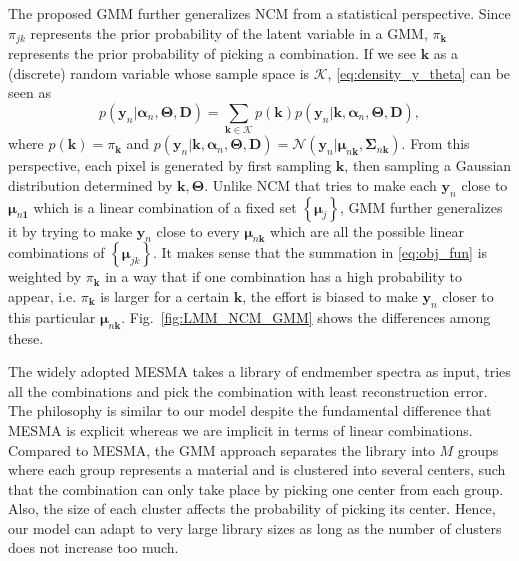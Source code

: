 \documentclass[twocolumn,english]{IEEEtran}
\theoremstyle{plain}
\begin{document}
The proposed GMM further generalizes NCM from a statistical perspective.
Since $\pi_{jk}$ represents the prior probability of the latent variable
in a GMM, $\pi_{\mathbf{k}}$ represents the prior probability of
picking a combination. If we see $\mathbf{k}$ as a (discrete) random
variable whose sample space is $\mathcal{K}$, \eqref{eq:density_y_theta}
can be seen as 
\[
p\left(\mathbf{y}_{n}\vert\boldsymbol{\alpha}_{n},\boldsymbol{\Theta},\mathbf{D}\right)=\sum_{\mathbf{k}\in\mathcal{K}}p\left(\mathbf{k}\right)p\left(\mathbf{y}_{n}\vert\mathbf{k},\boldsymbol{\alpha}_{n},\boldsymbol{\Theta},\mathbf{D}\right),
\]
where $p\left(\mathbf{k}\right)=\pi_{\mathbf{k}}$ and $p\left(\mathbf{y}_{n}\vert\mathbf{k},\boldsymbol{\alpha}_{n},\boldsymbol{\Theta},\mathbf{D}\right)=\mathcal{N}\left(\mathbf{y}_{n}\vert\boldsymbol{\mu}_{n\mathbf{k}},\boldsymbol{\Sigma}_{n\mathbf{k}}\right)$.
From this perspective, each pixel is generated by first sampling $\mathbf{k}$,
then sampling a Gaussian distribution determined by $\mathbf{k},\boldsymbol{\Theta}$.
Unlike NCM that tries to make each $\mathbf{y}_{n}$ close to $\boldsymbol{\mu}_{n\mathbf{1}}$
which is a linear combination of a fixed set $\left\{ \boldsymbol{\mu}_{j}\right\} $,
GMM further generalizes it by trying to make $\mathbf{y}_{n}$ close
to every $\boldsymbol{\mu}_{n\mathbf{k}}$ which are all the possible
linear combinations of $\left\{ \boldsymbol{\mu}_{jk}\right\} $.
It makes sense that the summation in \eqref{eq:obj_fun} is weighted
by $\pi_{\mathbf{k}}$ in a way that if one combination has a high
probability to appear, i.e. $\pi_{\mathbf{k}}$ is larger for a certain
$\mathbf{k}$, the effort is biased to make $\mathbf{y}_{n}$ closer
to this particular $\boldsymbol{\mu}_{n\mathbf{k}}$. Fig.~\ref{fig:LMM_NCM_GMM}
shows the differences among these.

The widely adopted MESMA takes a library of endmember spectra as input,
tries all the combinations and pick the combination with least reconstruction
error. The philosophy is similar to our model despite the fundamental
difference that MESMA is explicit whereas we are implicit in terms
of linear combinations. Compared to MESMA, the GMM approach separates
the library into $M$ groups where each group represents a material
and is clustered into several centers, such that the combination can
only take place by picking one center from each group. Also, the size
of each cluster affects the probability of picking its center. Hence,
our model can adapt to very large library sizes as long as the number
of clusters does not increase too much.
\end{document}
